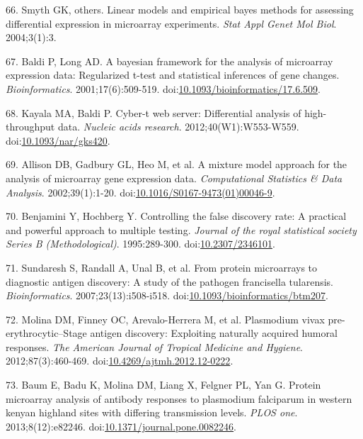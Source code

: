 \documentclass[]{article}
\begin{document}
\hypertarget{ref-smyth2004ebayes}{}
66. Smyth GK, others. Linear models and empirical bayes methods for
assessing differential expression in microarray experiments. \emph{Stat
Appl Genet Mol Biol}. 2004;3(1):3.

\hypertarget{ref-baldi2001cybert}{}
67. Baldi P, Long AD. A bayesian framework for the analysis of
microarray expression data: Regularized t-test and statistical
inferences of gene changes. \emph{Bioinformatics}. 2001;17(6):509-519.
doi:\href{https://doi.org/10.1093/bioinformatics/17.6.509}{10.1093/bioinformatics/17.6.509}.

\hypertarget{ref-kayala2012cyber}{}
68. Kayala MA, Baldi P. Cyber-t web server: Differential analysis of
high-throughput data. \emph{Nucleic acids research}.
2012;40(W1):W553-W559.
doi:\href{https://doi.org/10.1093/nar/gks420}{10.1093/nar/gks420}.

\hypertarget{ref-allison2002mmm}{}
69. Allison DB, Gadbury GL, Heo M, et al. A mixture model approach for
the analysis of microarray gene expression data. \emph{Computational
Statistics \& Data Analysis}. 2002;39(1):1-20.
doi:\href{https://doi.org/10.1016/S0167-9473(01)00046-9}{10.1016/S0167-9473(01)00046-9}.

\hypertarget{ref-benjamini1995fdr}{}
70. Benjamini Y, Hochberg Y. Controlling the false discovery rate: A
practical and powerful approach to multiple testing. \emph{Journal of
the royal statistical society Series B (Methodological)}. 1995:289-300.
doi:\href{https://doi.org/10.2307/2346101}{10.2307/2346101}.

\hypertarget{ref-sundaresh2007}{}
71. Sundaresh S, Randall A, Unal B, et al. From protein microarrays to
diagnostic antigen discovery: A study of the pathogen francisella
tularensis. \emph{Bioinformatics}. 2007;23(13):i508-i518.
doi:\href{https://doi.org/10.1093/bioinformatics/btm207}{10.1093/bioinformatics/btm207}.

\hypertarget{ref-molina2012}{}
72. Molina DM, Finney OC, Arevalo-Herrera M, et al. Plasmodium vivax
pre-erythrocytic--Stage antigen discovery: Exploiting naturally acquired
humoral responses. \emph{The American Journal of Tropical Medicine and
Hygiene}. 2012;87(3):460-469.
doi:\href{https://doi.org/10.4269/ajtmh.2012.12-0222}{10.4269/ajtmh.2012.12-0222}.

\hypertarget{ref-baum2013}{}
73. Baum E, Badu K, Molina DM, Liang X, Felgner PL, Yan G. Protein
microarray analysis of antibody responses to plasmodium falciparum in
western kenyan highland sites with differing transmission levels.
\emph{PLOS one}. 2013;8(12):e82246.
doi:\href{https://doi.org/10.1371/journal.pone.0082246}{10.1371/journal.pone.0082246}.
\end{document}
